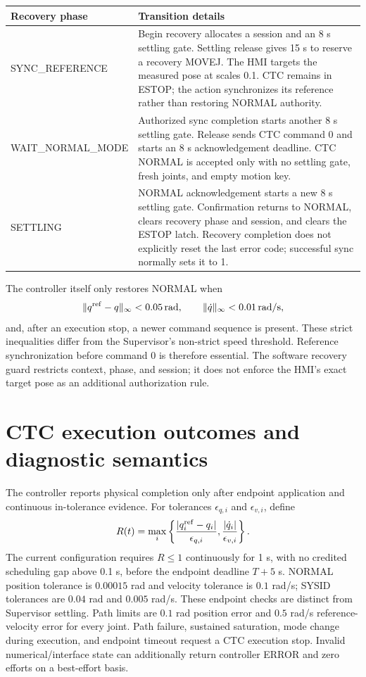 \documentclass[11pt,a4paper]{report}
\begin{document}
\begin{longtable}{L{.28\linewidth}L{.65\linewidth}}
\toprule Recovery phase & Transition details \\\midrule\endhead
SYNC\_REFERENCE & Begin recovery allocates a session and an 8 s settling gate. Settling release gives 15 s to reserve a recovery MOVEJ. The HMI targets the measured pose at scales 0.1. CTC remains in ESTOP; the action synchronizes its reference rather than restoring NORMAL authority. \\
WAIT\_NORMAL\_MODE & Authorized sync completion starts another 8 s settling gate. Release sends CTC command 0 and starts an 8 s acknowledgement deadline. CTC NORMAL is accepted only with no settling gate, fresh joints, and empty motion key. \\
SETTLING & NORMAL acknowledgement starts a new 8 s settling gate. Confirmation returns to NORMAL, clears recovery phase and session, and clears the ESTOP latch. Recovery completion does not explicitly reset the last error code; successful sync normally sets it to 1. \\
\bottomrule
\end{longtable}
The controller itself only restores NORMAL when
\begin{equation}
 \|q^{\rm ref}-q\|_\infty<0.05\,\mathrm{rad},\qquad
 \|\dot q\|_\infty<0.01\,\mathrm{rad/s},
\end{equation}
and, after an execution stop, a newer command sequence is present. These strict inequalities differ from the Supervisor's non-strict speed threshold. Reference synchronization before command 0 is therefore essential. The software recovery guard restricts context, phase, and session; it does not enforce the HMI's exact target pose as an additional authorization rule.

\section{CTC execution outcomes and diagnostic semantics}
The controller reports physical completion only after endpoint application and continuous in-tolerance evidence. For tolerances $\epsilon_{q,i}$ and $\epsilon_{v,i}$, define
\begin{equation}
 R(t)=\max_i\left\{\frac{|q_i^{\rm ref}-q_i|}{\epsilon_{q,i}},
                    \frac{|\dot q_i|}{\epsilon_{v,i}}\right\}.
\end{equation}
The current configuration requires $R\le1$ continuously for 1 s, with no credited scheduling gap above 0.1 s, before the endpoint deadline $T+5$ s. NORMAL position tolerance is $0.00015$ rad and velocity tolerance is $0.1$ rad/s; SYSID tolerances are $0.04$ rad and $0.005$ rad/s. These endpoint checks are distinct from Supervisor settling. Path limits are $0.1$ rad position error and $0.5$ rad/s reference-velocity error for every joint. Path failure, sustained saturation, mode change during execution, and endpoint timeout request a CTC execution stop. Invalid numerical/interface state can additionally return controller ERROR and zero efforts on a best-effort basis.
\end{document}

